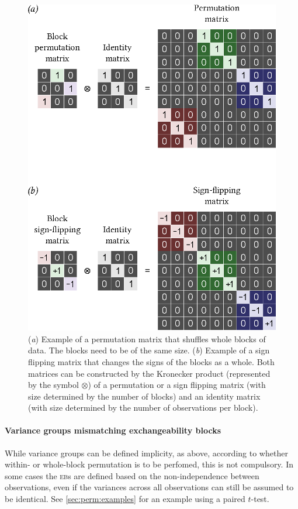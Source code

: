 \begin{figure}[!p]
\centering
\includegraphics{images/whole-block.eps}
\caption[Example of permutation and sign flipping matrix for whole-block exchangeability]{(\emph{a}) Example of a permutation matrix that shuffles whole blocks of data. The blocks need to be of the same size. (\emph{b}) Example of a sign flipping matrix that changes the signs of the blocks as a whole. Both matrices can be constructed by the Kronecker product (represented by the symbol $\otimes$) of a permutation or a sign flipping matrix (with size determined by the number of blocks) and an identity matrix (with size determined by the number of observations per block).}
\label{fig:perm:whole-block}
\end{figure}

\paragraph{Variance groups mismatching exchangeability blocks} While variance groups can be defined implicity, as above, according to whether within- or whole-block permutation is to be perfomed, this is not compulsory. In some cases the \textsc{eb}s are defined based on the non-independence between observations, even if the variances across all observations can still be assumed to be identical. See \ref{sec:perm:examples} for an example using a paired $t$-test.

